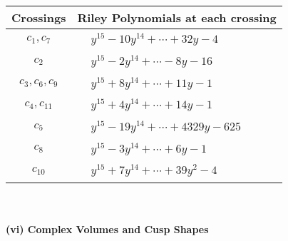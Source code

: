 \documentclass[1p]{elsarticle_modified}
\theoremstyle{definition}
\begin{document}
\begin{tabular}{m{50pt}|m{274pt}}
Crossings & \hspace{64pt}Riley Polynomials at each crossing \\
\hline $$\begin{aligned}c_{1},c_{7}\end{aligned}$$&$\begin{aligned}
&y^{15}-10 y^{14}+\cdots+32 y-4
\end{aligned}$\\
\hline $$\begin{aligned}c_{2}\end{aligned}$$&$\begin{aligned}
&y^{15}-2 y^{14}+\cdots-8 y-16
\end{aligned}$\\
\hline $$\begin{aligned}c_{3},c_{6},c_{9}\end{aligned}$$&$\begin{aligned}
&y^{15}+8 y^{14}+\cdots+11 y-1
\end{aligned}$\\
\hline $$\begin{aligned}c_{4},c_{11}\end{aligned}$$&$\begin{aligned}
&y^{15}+4 y^{14}+\cdots+14 y-1
\end{aligned}$\\
\hline $$\begin{aligned}c_{5}\end{aligned}$$&$\begin{aligned}
&y^{15}-19 y^{14}+\cdots+4329 y-625
\end{aligned}$\\
\hline $$\begin{aligned}c_{8}\end{aligned}$$&$\begin{aligned}
&y^{15}-3 y^{14}+\cdots+6 y-1
\end{aligned}$\\
\hline $$\begin{aligned}c_{10}\end{aligned}$$&$\begin{aligned}
&y^{15}+7 y^{14}+\cdots+39 y^2-4
\end{aligned}$\\
\hline
\end{tabular}\\~\\
\newpage\flushleft \textbf{(vi) Complex Volumes and Cusp Shapes}
\end{document}
